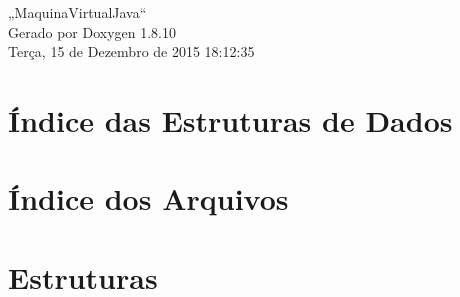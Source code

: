 \documentclass[twoside]{book}
\newcommand{\+}{\discretionary{\mbox{\scriptsize$\hookleftarrow$}}{}{}}
\newcommand{\clearemptydoublepage}{%
  \newpage{\pagestyle{empty}\cleardoublepage}%
}
\begin{document}
\hypersetup{pageanchor=false,
             bookmarks=true,
             bookmarksnumbered=true,
             pdfencoding=unicode
            }
\begin{titlepage}
\vspace*{7cm}
\begin{center}%
{\Large „\+Maquina\+Virtual\+Java“ }\\
\vspace*{1cm}
{\large Gerado por Doxygen 1.8.10}\\
\vspace*{0.5cm}
{\small Terça, 15 de Dezembro de 2015 18:12:35}\\
\end{center}
\end{titlepage}
\clearemptydoublepage
\tableofcontents
\clearemptydoublepage
{}
\hypersetup{pageanchor=true}

\chapter{Índice das Estruturas de Dados}

\chapter{Índice dos Arquivos}

\chapter{Estruturas}

























\end{document}
